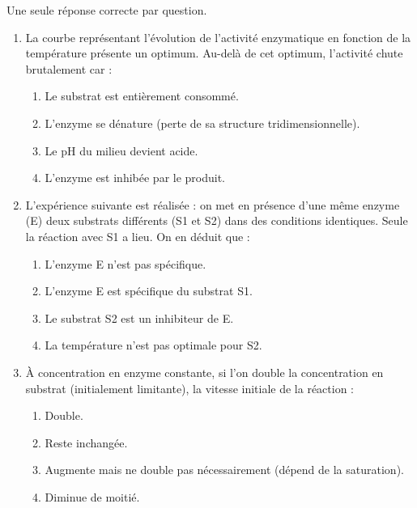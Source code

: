 \documentclass[11pt]{article}
\begin{document}
\begin{exercice}
Une seule réponse correcte par question.
\begin{enumerate}
    \item La courbe représentant l'évolution de l'activité enzymatique en fonction de la température présente un optimum. Au-delà de cet optimum, l'activité chute brutalement car :
    \begin{enumerate}
        \item Le substrat est entièrement consommé.
        \item L'enzyme se dénature (perte de sa structure tridimensionnelle).
        \item Le pH du milieu devient acide.
        \item L'enzyme est inhibée par le produit.
    \end{enumerate}
    \item L'expérience suivante est réalisée : on met en présence d'une même enzyme (E) deux substrats différents (S1 et S2) dans des conditions identiques. Seule la réaction avec S1 a lieu. On en déduit que :
    \begin{enumerate}
        \item L'enzyme E n'est pas spécifique.
        \item L'enzyme E est spécifique du substrat S1.
        \item Le substrat S2 est un inhibiteur de E.
        \item La température n'est pas optimale pour S2.
    \end{enumerate}
    \item À concentration en enzyme constante, si l'on double la concentration en substrat (initialement limitante), la vitesse initiale de la réaction :
    \begin{enumerate}
        \item Double.
        \item Reste inchangée.
        \item Augmente mais ne double pas nécessairement (dépend de la saturation).
        \item Diminue de moitié.
    \end{enumerate}
\end{enumerate}
\end{exercice}
\end{document}
